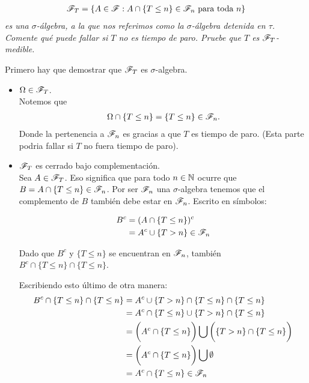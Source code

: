 \emph{
	\begin{align}
		\mathscr{F}_T=\left\{ A\in\mathscr{F}:A\cap\left\{ T\leq n\right\} \in\mathscr{F}_n\text{ para toda } n\right\} 
	\end{align}
	es una ${\sigma}$-\'algebra, 
	a la que nos referimos como la ${\sigma}$-\'algebra detenida en ${\tau}$. Comente qu\'e puede fallar si ${T}$ no es tiempo de paro. 
	Pruebe que ${T}$ es ${\mathscr{F}_T}$-medible.\\		
}			
		
	Primero hay que demostrar que ${\mathscr{F}_T}$ es ${\sigma}$-algebra.\\
	
	\begin{itemize}
		\item ${\Omega \in \mathscr{F}_T}$. \\
		
			Notemos que 
			\begin{align}
				\Omega \cap \{T \leq n\} = \{T \leq n\} \in \mathscr{F}_n.
			\end{align}
			Donde la pertenencia a ${\mathscr{F}_n}$ es gracias a que ${T}$ es tiempo de paro. (Esta parte podria fallar si 
			${T}$ no fuera tiempo de paro).\\
		
		\item ${\mathscr{F}_T}$ es cerrado bajo complementación.\\
		
			Sea ${A \in \mathscr{F}_T}$. Eso significa que para todo ${n \in  \mathbb{N}}$ ocurre que ${B = A \cap \{ T \leq n \} \in \mathscr{F}_n}$. 
			Por ser ${\mathscr{F}_n}$ una ${\sigma}$-algebra tenemos que el complemento de ${B}$ también debe estar en ${\mathscr{F}_n}$. 
			Escrito en símbolos:
			
			\begin{align}
				B^c 	&= (A   \cap \{ T \leq n \})^c \\
						&=  A^c \cup \{ T > n \} \in \mathscr{F}_n
			\end{align}
			
			Dado que ${B^c}$ y ${\{ T \leq n \}}$ se encuentran en ${\mathscr{F}_n}$, también ${B^c \cap \{ T \leq n \} \cap \{ T \leq n \}}$.
			
			Escribiendo esto último de otra manera:
			\begin{align}
				B^c \cap \{ T \leq n \} \cap \{ T \leq n \} 	&=		A^c \cup \{ T > n \} \cap \{ T \leq n \} \cap \{ T \leq n \} \\
																&= 		A^c \cap \{ T \leq n \} \cup \{ T > n \} \cap \{ T \leq n \} \\
																&= 		\bigg(A^c \cap \{ T \leq n \}\bigg) 
																			\bigcup 
																		\bigg(\{ T > n \} \cap \{ T \leq n \}\bigg) \\
																&=		\bigg(A^c \cap \{ T \leq n \}\bigg)	\bigcup \emptyset \\
																&=		A^c \cap \{ T \leq n \} \in \mathscr{F}_n
			\end{align}
			

\end{itemize}
